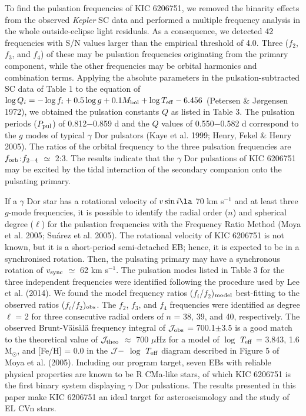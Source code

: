 \documentclass[useAMS,usenatbib,usegraphicx]{mn2e}
\begin{document}
To find the pulsation frequencies of KIC 6206751, we removed the binarity effects from the observed {\it Kepler} SC data 
and performed a multiple frequency analysis in the whole outside-eclipse light residuals. As a consequence, we detected 
42 frequencies with S/N values larger than the empirical threshold of 4.0. Three ($f_2$, $f_3$, and $f_4$) of these may 
be pulsation frequencies originating from the primary component, while the other frequencies may be orbital harmonics and 
combination terms. Applying the absolute parameters in the pulsation-subtracted SC data of Table 1 to the equation of 
$\log Q_i = -\log f_i + 0.5 \log g + 0.1M_{\rm bol} + \log T_{\rm eff} - 6.456$ (Petersen \& J\o rgensen 1972), we obtained 
the pulsation constants $Q$ as listed in Table 3. The pulsation periods ($P_{\rm pul}$) of 0.812$-$0.859 d and the $Q$ values 
of 0.550$-$0.582 d correspond to the $g$ modes of typical $\gamma$ Dor pulsators (Kaye et al. 1999; Henry, Fekel \& Henry 2005). 
The ratios of the orbital frequency to the three pulsation frequencies are $f_{\rm orb}$:$f_{\rm 2-4}$ $\simeq$ 2:3. 
The results indicate that the $\gamma$ Dor pulsations of KIC 6206751 may be excited by the tidal interaction of 
the secondary companion onto the pulsating primary. 

If a $\gamma$ Dor star has a rotational velocity of $v \sin i \la$ 70 km s$^{-1}$ and at least three $g$-mode frequencies, 
it is possible to identify the radial order ($n$) and spherical degree ($\ell$) for the pulsation frequencies with 
the Frequency Ratio Method (Moya et al. 2005; Su\'arez et al. 2005). The rotational velocity of KIC 6206751 is not known, 
but it is a short-period semi-detached EB; hence, it is expected to be in a synchronised rotation. Then, the pulsating 
primary may have a synchronous rotation of $v_{\rm sync}$ $\simeq$ 62 km s$^{-1}$. The pulsation modes listed in Table 3 
for the three independent frequencies were identified following the procedure used by Lee et al. (2014). We found 
the model frequency ratios ($f_i$/$f_2$)$_{\rm model}$ best-fitting to the observed ratios ($f_i$/$f_2$)$_{\rm obs}$. 
The $f_2$, $f_3$, and $f_4$ frequencies were identified as degree $\ell$ = 2 for three consecutive radial orders of 
$n$ = 38, 39, and 40, respectively. The observed Brunt-V\"ais\"al\"a frequency integral of $\cal J_{\rm obs}$ = 700.1$\pm$3.5 
is a good match to the theoretical value of $\cal J_{\rm theo}$ $\approx$ 700 $\mu$Hz for a model of 
$\log$ $T_{\rm eff}$ = 3.843, 1.6 M$_\odot$, and [Fe/H] = 0.0 in the $\cal J -$ $\log$ $T_{\rm eff}$ diagram described in 
Figure 5 of Moya et al. (2005). Including our program target, seven EBs with reliable physical properties are known to be 
R CMa-like stars, of which KIC 6206751 is the first binary system displaying $\gamma$ Dor pulsations. The results presented 
in this paper make KIC 6206751 an ideal target for asteroseismology and the study of EL CVn stars.
\end{document}
